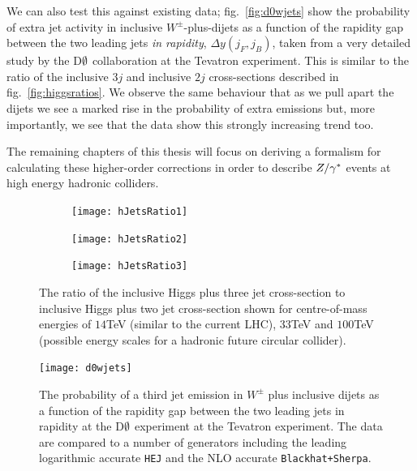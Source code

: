 		We can also test this against existing data; fig.~\eqref{fig:d0wjets} show the probability of extra jet activity in inclusive
		$W^\pm$-plus-dijets as a function of the rapidity gap
		between the two leading jets \emph{in rapidity}, $\Delta y(j_F, j_B)$, taken from a very detailed study by the D$\emptyset$
		collaboration \cite{Abazov:2013gpa} at the Tevatron experiment.  This is similar to the ratio of the inclusive $3j$ and
		inclusive $2j$ cross-sections described in fig.~\eqref{fig:higgsratios}.  We observe the same behaviour that as we pull apart
		the dijets we see a marked rise in the probability of extra emissions but, more importantly, we see that the data show this
		strongly increasing trend too.

		The remaining chapters of this thesis will focus on deriving a formalism for calculating these higher-order corrections in order
		to describe $Z/\gamma^*$ events at high energy hadronic colliders.

		\begin{figure}[tpb]
			\centering
			\hspace{-0.8cm}
			\begin{subfigure}[b]{0.7\textwidth}
				\texttt{[image: hJetsRatio1]}
				\caption{}
				\label{fig:hJetsRatio1}
			\end{subfigure}
			\begin{subfigure}[b]{0.48\textwidth}
				\texttt{[image: hJetsRatio2]}
				\caption{}
				\label{fig:hJetsRatio2}
			\end{subfigure}
			\begin{subfigure}[b]{0.48\textwidth}
				\texttt{[image: hJetsRatio3]}
				\caption{}
				\label{fig:hJetsRatio3}
			\end{subfigure}

			\caption{The ratio of the inclusive Higgs plus three jet cross-section to inclusive Higgs plus two jet cross-section
			         shown for centre-of-mass energies of $14$TeV (similar to the current LHC), $33$TeV and $100$TeV (possible
			         energy scales for a hadronic future circular collider).}

			\label{fig:higgsratios}
		\end{figure}

		\begin{figure}[hbtp]
			\centering
			\texttt{[image: d0wjets]}
			\caption{The probability of a third jet emission in $W^\pm$ plus inclusive dijets as a function of the rapidity gap
			         between the two leading jets in rapidity at the D$\emptyset$ experiment at the Tevatron experiment.
			         The data are compared to a number of generators including the leading logarithmic accurate \texttt{HEJ}
			         and the NLO accurate \texttt{Blackhat+Sherpa}.}
			\label{fig:d0wjets}
  		\end{figure}

